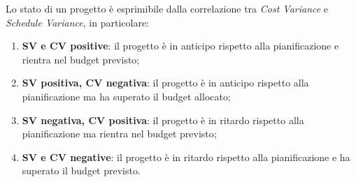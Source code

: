 		Lo stato di un progetto è esprimibile dalla correlazione tra \textit{Cost Variance} e \textit{Schedule Variance}, in particolare:
		\begin{enumerate}
			\item{\textbf{SV e CV positive}: il progetto è in anticipo rispetto alla pianificazione e rientra nel budget previsto;}
			\item{\textbf{SV positiva, CV negativa}: il progetto è in anticipo rispetto alla pianificazione ma ha superato il budget allocato;}
			\item{\textbf{SV negativa, CV positiva}: il progetto è in ritardo rispetto alla pianificazione ma rientra nel budget previsto;}
			\item{\textbf{SV e CV negative}: il progetto è in ritardo rispetto alla pianificazione e ha superato il budget previsto.}
		\end{enumerate}